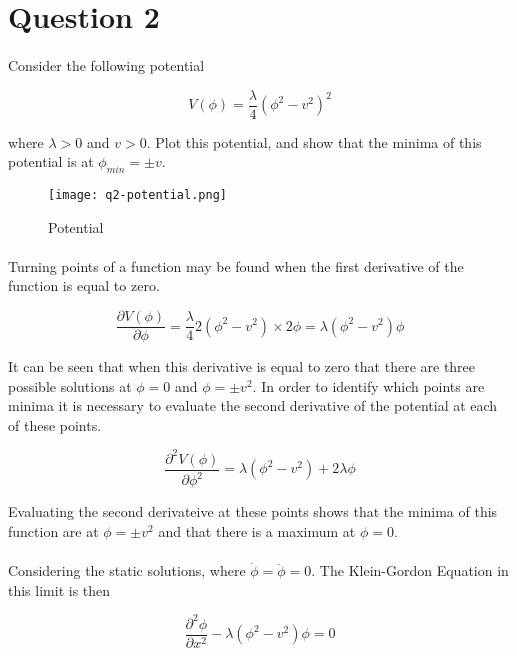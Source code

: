 \section{Question 2}
\paragraph{}
Consider the following potential

$$
	V(\phi) = \frac{\lambda}{4}(\phi^2 - v^2)^2
$$

where $\lambda > 0$ and $v > 0$. Plot this potential, and show that the minima of this potential is at $\phi_{min}=\pm v$.

\begin{figure}[H]
    \centering
    \texttt{[image: q2-potential.png]}
    \caption{Potential}
    \label{fig:q2-potential}
\end{figure}
%
\paragraph{}
Turning points of a function may be found when the first derivative of the function is equal to zero.

$$
	\frac{\partial V(\phi) } {\partial \phi}
	= \frac{\lambda}{4} 2 (\phi^2 - v^{2}) \times 2 \phi
	= \lambda (\phi^2 - v^{2}) \phi
$$

It can be seen that when this derivative is equal to zero that there are three possible solutions at $\phi=0$ and $\phi=\pm v^{2}$.  In order to identify which points are minima it is necessary to evaluate the second derivative of the potential at each of these points.

$$
	\frac{\partial ^2 V(\phi) } {\partial \phi ^2}
	= \lambda (\phi^{2} - v^{2}) + 2 \lambda \phi
$$

Evaluating the second derivateive at these points shows that the minima of this function are at $\phi=\pm v^{2}$ and that there is a maximum at $\phi=0$.


\paragraph{}
Considering the static solutions, where $\dot{\phi} = \ddot{\phi} = 0$. The Klein-Gordon Equation in this limit is then

$$
	\frac{\partial ^2 \phi } {\partial x^2} - \lambda (\phi ^{2} - v^{2})\phi = 0
$$
